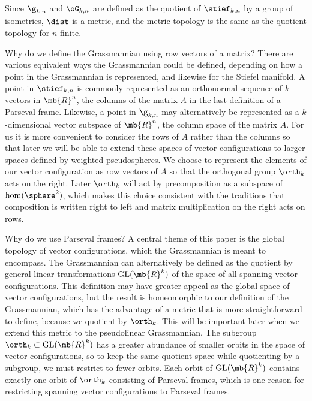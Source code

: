 \begin{observation}
Since $\g_{k,n}$ and $\oG_{k,n}$ are defined as the quotient of $\stief_{k,n}$ by a group of isometries, $\dist$ is a metric, and the metric topology is the same as the quotient topology for $n$ finite.
\end{observation}

\begin{justification}
Why do we define the Grassmannian using row vectors of a matrix?
There are various equivalent ways the Grassmannian could be defined, depen\-ding on how a point in the Grassmannian is represented, and likewise for the Stiefel manifold.
A point in $\stief_{k,n}$ is commonly represented as an orthonormal sequence of $k$ vectors in $\mb{R}^n$, \ie the columns of the matrix $A$ in the last definition of a Parseval frame.
Likewise, a point in $\g_{k,n}$ may alternatively be represented as a $k$-dimensional vector subspace of $\mb{R}^n$, \ie the column space of the matrix $A$.
For us it is more convenient to consider the rows of $A$ rather than the columns so that later we will be able to extend these spaces of vector configurations to larger spaces defined by weighted pseudospheres.
We choose to represent the elements of our vector configuration as row vectors of $A$ so that the orthogonal group $\orth_k$ acts on the right. Later $\orth_k$ will act by precomposition as a subspace of $\hom(\sphere^2)$, which makes this choice consistent with the traditions that composition is written right to left and matrix multiplication on the right acts on rows.
\end{justification}

\begin{justification}
Why do we use Parseval frames?
A central theme of this paper is the global topology of vector configurations, which the Grassmannian is meant to encompass.
The Grassmannian can alternatively be defined as the quotient by general linear transformations $\mathrm{GL}(\mb{R}^k)$ of the space of all spanning vector configurations. This definition may have greater appeal as the global space of vector configurations, but the result is homeomorphic to our definition of the Grassmannian, which has the advantage of a metric that is more straightforward to define, because we quotient by $\orth_k$. This will be important later when we extend this metric to the pseudolinear Grassmannian.
The subgroup $\orth_k \subset \mathrm{GL}(\mb{R}^k)$ has a greater abundance of smaller orbits in the space of vector configurations, so to keep the same quotient space while quotienting by a subgroup, we must restrict to fewer orbits.
Each orbit of $\mathrm{GL}(\mb{R}^k)$ contains exactly one orbit of $\orth_k$ consisting of Parseval frames, which is one reason for restricting spanning vector configurations to Parseval frames.
\end{justification}

